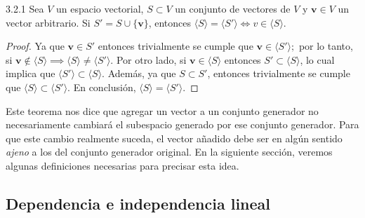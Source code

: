 \documentclass[apuntes]{subfiles}
\begin{document}
\begin{teo} {3.2.1} 
Sea $V$ un espacio vectorial, $S\subset V$ un conjunto de vectores de $V$ y $\mathbf{v}\in V$ un vector arbitrario. Si $S'=S\cup\{\mathbf{v}\}$, entonces $\langle S \rangle = \langle S' \rangle \iff v\in\langle S \rangle.$

\begin{proof}
Ya que $\mathbf{v}\in S'$ entonces trivialmente se cumple que $\mathbf{v}\in\langle S'\rangle;$ por lo tanto, si $\mathbf{v}\notin \langle S \rangle \implies \langle S \rangle \neq \langle S' \rangle.$ Por otro lado, si $\mathbf{v}\in\langle S \rangle$ entonces $S'\subset\langle S \rangle$, lo cual implica que $\langle S' \rangle \subset \langle S \rangle.$ Además, ya que $S\subset S'$, entonces trivialmente se cumple que $\langle S \rangle \subset \langle S' \rangle.$ En conclusión, $\langle S \rangle =\langle S' \rangle.$
\end{proof}
        
    Este teorema nos dice que agregar un vector a un conjunto generador no necesariamente cambiará el subespacio generado por ese conjunto generador. Para que este cambio realmente suceda, el vector añadido debe ser en algún sentido \emph{ajeno} a los del conjunto generador original. En la siguiente sección, veremos algunas definiciones necesarias para precisar esta idea.

\end{teo}

\newpage
\subsection*{Dependencia e independencia lineal} \label{Subsec:Dependencia_e_independencia_lineal}
\end{document}

